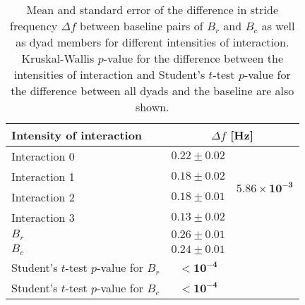 \begin{table}
\centering
\caption{Mean and standard error of the difference in stride frequency $\Delta f$ between baseline pairs of $B_r$ and $B_c$ as well as dyad members for different intensities of interaction. Kruskal-Wallis $p$-value for the difference between the intensities of interaction and Student's $t$-test $p$-value for the difference between all dyads and the baseline are also shown.}
\label{tab:delta_f}
\begin{tabular}{lcc}
\toprule
Intensity of interaction & \multicolumn{2}{c}{$\Delta f$ [Hz]}  \\
\midrule
Interaction 0 &$0.22 \pm 0.02$  & \multirow{4}{*}{$\mathbf{5.86 \times 10^{-3}}$} \\
Interaction 1 &$0.18 \pm 0.02$ & \\
Interaction 2 &$0.18 \pm 0.01$ & \\
Interaction 3 &$0.13 \pm 0.02$ & \\
\midrule
$B_r$ &$0.26 \pm 0.01$ & \\
$B_c$ &$0.24 \pm 0.01$ & \\
\midrule
Student's $t$-test $p$-value for $B_r$ & $\mathbf{< 10^{-4}}$ \\Student's $t$-test $p$-value for $B_c$ & $\mathbf{< 10^{-4}}$ \\\bottomrule
\end{tabular}
\end{table}
